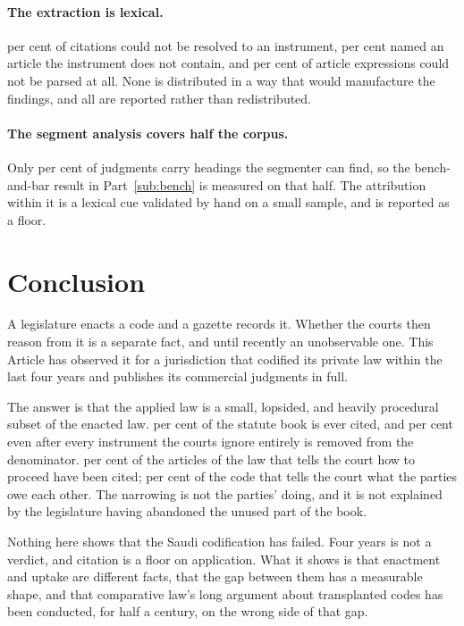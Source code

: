 \documentclass[12pt]{article}
\begin{document}
\paragraph{The extraction is lexical.} \nUnmatchedShare{} per cent of
citations could not be resolved to an instrument, \nOutOfRangeShare{} per cent
named an article the instrument does not contain, and
\nUnparsedShare{} per cent of article expressions could not be parsed at all.
None is distributed in a way that would manufacture the findings, and all are
reported rather than redistributed.

\paragraph{The segment analysis covers half the corpus.} Only
\nSegmentedShare{} per cent of judgments carry headings the segmenter can
find, so the bench-and-bar result in Part~\ref{sub:bench} is measured on that
half. The
attribution within it is a lexical cue validated by hand on a small sample,
and is reported as a floor.

\section{Conclusion}
\label{sec:conclusion}

A legislature enacts a code and a gazette records it. Whether the courts then
reason from it is a separate fact, and until recently an unobservable one.
This Article has observed it for a jurisdiction that codified its private law
within the last four years and publishes its commercial judgments in full.

The answer is that the applied law is a small, lopsided, and heavily
procedural subset of the enacted law. \nArticlesCitedShare{} per cent of the
statute book is ever cited, and \nAppliedOnlyShare{} per cent even after every
instrument the courts ignore entirely is removed from the denominator.
\nCCLShare{} per cent of the articles of the law that tells the court how to
proceed have been cited; \nCivilShare{} per cent of the code that tells the
court what the parties owe each other. The narrowing is not the parties'
doing, and it is not explained by the legislature having abandoned the unused
part of the book.

Nothing here shows that the Saudi codification has failed. Four years is not a
verdict, and citation is a floor on application. What it shows is that
enactment and uptake are different facts, that the gap between them has a
measurable shape, and that comparative law's long argument about transplanted
codes has been conducted, for half a century, on the wrong side of that gap.
\end{document}
